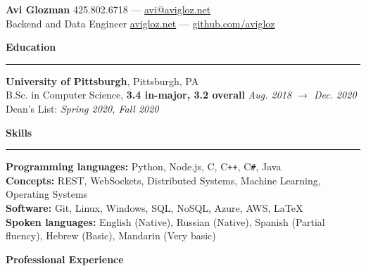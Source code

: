 \documentclass[10pt]{article}
\begin{document}
	\pagestyle{empty}
	\begin{center}
		{\huge \textbf{Avi Glozman}} {\large \hfill 425.802.6718 --- \href{mailto:avi@avigloz.net}{avi@avigloz.net}}\\
		\vspace{1.25mm}
		{\large Backend and Data Engineer \hfill \href{https://avigloz.net}{avigloz.net} --- \href{https://github.com/avigloz}{github.com/avigloz}}
	\end{center}
	
	\begin{flushleft}	
		\vspace{-1.65mm}
		{\large \raggedright \textbf{Education}}
		\vspace{1.25mm}
	
		\hrule
		
		\vspace{2.25mm}
		\textbf{University of Pittsburgh}, Pittsburgh, PA\\
      	{\small B.Sc. in Computer Science, \textbf{3.4 in-major, 3.2 overall} \hfill \textit{Aug. 2018 $\rightarrow$ Dec. 2020}}\\
		{\small Dean's List: \textit{Spring 2020, Fall 2020}}%
	
		\vspace{1.25mm} 
		{\large \raggedright \textbf{Skills}}
		\vspace{1.25mm}
	
		\hrule
	
		\vspace{2.25mm}
		\textbf{Programming languages:} Python, Node.js, C, C\texttt{++}, C\verb!#!, Java\\
		\vspace{0.5mm}
		\textbf{Concepts:} REST, WebSockets, Distributed Systems, Machine Learning, Operating Systems\\
		\vspace{0.5mm}
		\textbf{Software:} Git, Linux, Windows, SQL, NoSQL, Azure, AWS, \LaTeX\\ 
		\vspace{0.5mm}
		\textbf{Spoken languages:} English (Native), Russian (Native), Spanish (Partial fluency),  Hebrew (Basic), Mandarin (Very basic)

		\vspace{1.5mm}
		{\large \raggedright \textbf{Professional Experience}}
		\vspace{1.25mm}
	

\end{flushleft}
\end{document}
